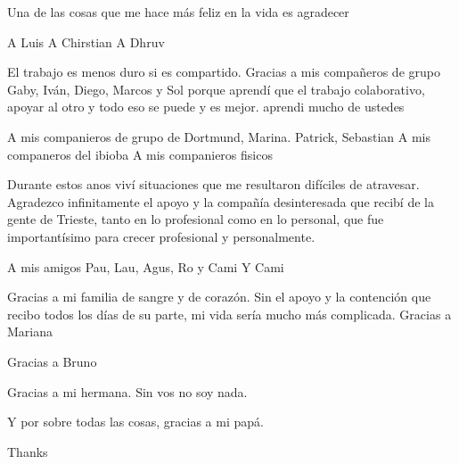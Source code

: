 \documentclass[./main.tex]{subfiles}
\begin{document}
Una de las cosas que me hace más feliz en la vida es agradecer

A Luis
A Chirstian
A Dhruv


El trabajo es menos duro si es compartido. Gracias a mis compañeros de grupo Gaby, Iván, Diego, Marcos y Sol porque aprendí que el trabajo colaborativo, apoyar al otro y todo eso se puede y es mejor. aprendi mucho de ustedes

A mis companieros de grupo de Dortmund, Marina. Patrick, Sebastian
A mis companeros del ibioba
A mis companieros fisicos

Durante estos anos viví situaciones que me resultaron difíciles de atravesar. Agradezco infinitamente el apoyo y la compañía desinteresada que recibí de la gente de Trieste, tanto en lo profesional como en lo personal, que fue importantísimo para crecer profesional y personalmente.  

A mis amigos
Pau, Lau, Agus, Ro y Cami Y Cami

Gracias a mi familia de sangre y de corazón. Sin el apoyo y la contención que recibo todos los días de su parte, mi vida sería mucho más complicada. Gracias a Mariana

Gracias a Bruno

Gracias a mi hermana. Sin vos no soy nada.

Y por sobre todas las cosas, gracias a mi papá.



Thanks
\end{document}
